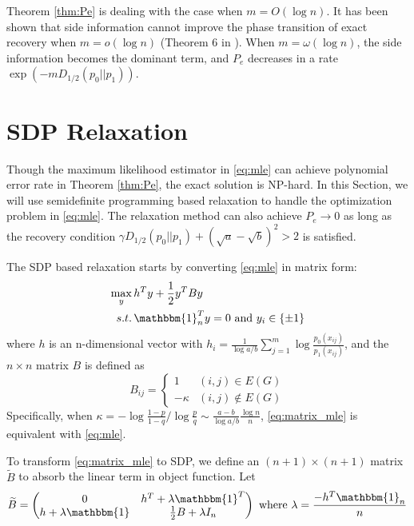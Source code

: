 \documentclass[conference]{IEEEtran}
\begin{document}
Theorem \ref{thm:Pe} is dealing with the case when $m=O(\log n)$. It has been shown
that side information cannot improve the phase transition of exact recovery when $m=o(\log n)$ (Theorem 6 in \cite{saad2018community}). When $m=\omega(\log n)$,
the side information becomes the dominant term, and $P_e$ decreases in a rate $\exp(-m D_{1/2}(p_0||p_1) )$.

\section{SDP Relaxation}
Though the maximum likelihood estimator in \eqref{eq:mle} can achieve polynomial
error rate in Theorem \ref{thm:Pe}, the exact solution is NP-hard. In this
Section, we will use semidefinite programming based relaxation to handle
the optimization problem in \eqref{eq:mle}. The relaxation method
can also achieve $P_e\to 0$ as long as the recovery condition
$\gamma D_{1/2}(p_0||p_1) + (\sqrt{a} - \sqrt{b})^2 > 2$ is satisfied.

The SDP based relaxation starts by converting \eqref{eq:mle} in matrix form:
\begin{align}
\max_{y}\, & h^T y + \frac{1}{2}y^T B y \notag \\
s.t.\, & \mathbbm{1}_n^T y = 0 \text{ and } y_i \in \{\pm 1 \} \label{eq:matrix_mle}
\end{align}
where $h$ is an n-dimensional vector with $h_i = \frac{1}{\log a/b}\sum_{j=1}^m \log \frac{p_0(x_{ij})}{p_1(x_{ij})}$, and the $n\times n $ matrix $B$ is defined as
\begin{equation}
B_{ij} = \begin{cases}
1 & (i,j)\in E(G) \\
-\kappa & (i,j) \not\in E(G)
\end{cases}
\end{equation}
Specifically, when $\kappa = -\log\frac{1-p}{1-q} / \log\frac{p}{q} \sim \frac{a-b}{\log a/b}\frac{\log n}{n}$, \eqref{eq:matrix_mle} is equivalent with \eqref{eq:mle}. 

To transform \eqref{eq:matrix_mle} to SDP,
we define an $(n+1) \times (n+1)$ matrix $\widetilde{B}$
to absorb the linear term in object function.
Let 
\begin{equation}
\widetilde{B} = \begin{pmatrix} 0 & h^T + \lambda \mathbbm{1}^T \\ h + \lambda \mathbbm{1} & \frac{1}{2}B + \lambda I_n \end{pmatrix}
\textrm{ where } \lambda = \frac{-h^T \mathbbm{1}_n}{n} 
\end{equation}
\end{document}
